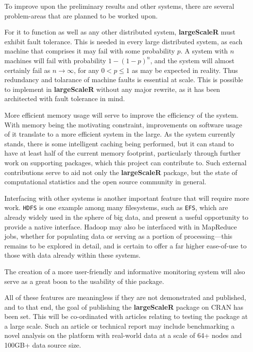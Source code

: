 To improve upon the preliminary results and other systems, there are several problem-areas that are planned to be worked upon.

For it to function as well as any other distributed system, \textbf{largeScaleR} must exhibit fault tolerance.
This is needed in every large distributed system, as each machine that comprises it may fail with some probability \(p\).
A system with \(n\) machines will fail with probability \(1-(1-p)^n\), and the system will almost certainly fail as \(n \to \infty\), for any \(0 < p \leq 1\) as may be expected in reality.
Thus redundancy and tolarance of machine faults is essential at scale.
This is possible to implement in \textbf{largeScaleR} without any major rewrite, as it has been architected with fault tolerance in mind.

More efficient memory usage will serve to improve the efficiency of the system.
With memory being the motivating constraint, improvements on software usage of it translate to a more efficient system in the large.
As the system currently stands, there is some intelligent caching being performed, but it can stand to have at least half of the current memory footprint, particularly through further work on supporting packages, which this project can contribute to.
Such external contributions serve to aid not only the \textbf{largeScaleR} package, but the state of computational statistics and the open source community in general.

Interfacing with other systems is another important feature that will require more work.
\texttt{HDFS} is one example among many filesystems, such as \texttt{EFS}, which are already widely used in the sphere of big data, and present a useful opportunity to provide a native interface.
Hadoop may also be interfaced with in MapReduce jobs, whether for populating data or serving as a portion of processing---this remains to be explored in detail, and is certain to offer a far higher ease-of-use to those with data already within these systems.

The creation of a more user-friendly and informative monitoring system will also serve as a great boon to the usability of thie package.

All of these features are meaningless if they are not demonstrated and published, and to that end, the goal of publishing the \textbf{largeScaleR} package on CRAN has been set.
This will be co-ordinated with articles relating to testing the package at a large scale.
Such an article or technical report may include benchmarking a novel analysis on the platform with real-world data at a scale of 64+ nodes and 100GB+ data source size.
